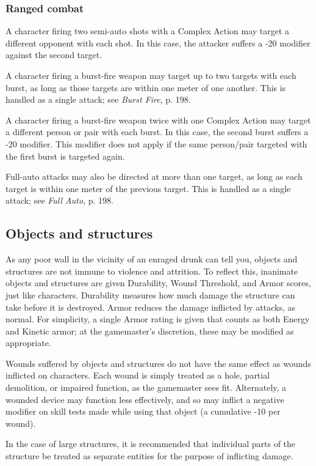 \subsubsection{Ranged combat}

A character firing two semi-auto shots with a Complex Action may target a different opponent with each shot. In this case, the attacker suffers a -20 modifier against the second target.

A character firing a burst-fire weapon may target up to two targets with each burst, as long as those targets are within one meter of one another. This is handled as a single attack; see \emph{Burst Fire}, p. 198.

A character firing a burst-fire weapon twice with one Complex Action may target a different person or pair with each burst. In this case, the second burst suffers a -20 modifier. This modifier does not apply if the same person/pair targeted with the first burst is targeted again.

Full-auto attacks may also be directed at more than one target, as long as each target is within one meter of the previous target. This is handled as a single attack; see \emph{Full Auto}, p. 198.


\subsection{Objects and structures}
\label{sec:objects-structures}

As any poor wall in the vicinity of an enraged drunk can tell you, objects and structures are not immune to violence and attrition. To reflect this, inanimate objects and structures are given Durability, Wound Threshold, and Armor scores, just like characters. Durability measures how much damage the structure can take before it is destroyed. Armor reduces the damage inflicted by attacks, as normal. For simplicity, a single Armor rating is given that counts as both Energy and Kinetic armor; at the gamemaster’s discretion, these may be modified as appropriate.

Wounds suffered by objects and structures do not have the same effect as wounds inflicted on characters. Each wound is simply treated as a hole, partial demolition, or impaired function, as the gamemaster sees fit. Alternately, a wounded device may function less effectively, and so may inflict a negative modifier on skill tests made while using that object (a cumulative -10 per wound).

In the case of large structures, it is recommended that individual parts of the structure be treated as separate entities for the purpose of inflicting damage.

